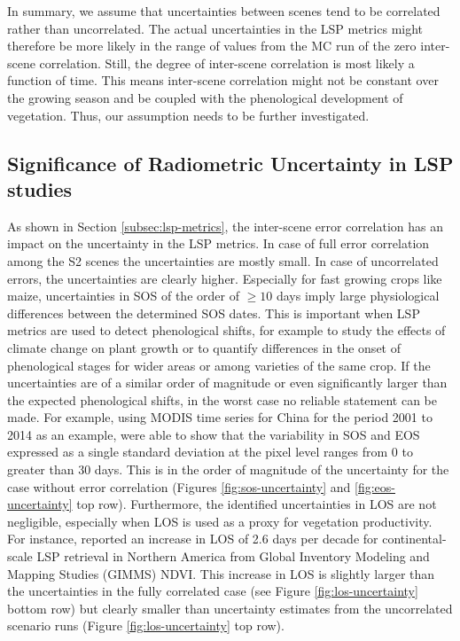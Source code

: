 In summary, we assume that uncertainties between scenes tend to be correlated rather than uncorrelated. The actual uncertainties in the \gls{LSP} metrics might therefore be more likely in the range of values from the  \gls{MC} run of the zero inter-scene correlation. Still, the degree of inter-scene correlation is most likely a function of time. This means inter-scene correlation might not be constant over the growing season and be coupled with the phenological development of vegetation. Thus, our assumption needs to be further investigated.

\subsection{Significance of Radiometric Uncertainty in \gls{LSP} studies}

As shown in Section \ref{subsec:lsp-metrics}, the inter-scene error correlation has an impact on the uncertainty in the \gls{LSP} metrics. In case of full error correlation among the \gls{S2} scenes the uncertainties are mostly small. In case of uncorrelated errors, the uncertainties are clearly higher. Especially for fast growing crops like maize, uncertainties in \gls{SOS} of the order of $\ge10$ days imply large physiological differences between the determined \gls{SOS} dates. This is important when \gls{LSP} metrics are used to detect phenological shifts, for example to study the effects of climate change on plant growth \citep{garonna_variability_2016} or to quantify differences in the onset of phenological stages for wider areas \citep{nietupski_spatiotemporal_2021} or among varieties of the same crop. If the uncertainties are of a similar order of magnitude or even significantly larger than the expected phenological shifts, in the worst case no reliable statement can be made. For example, using MODIS time series for China for the period 2001 to 2014 as an example, \cite{luo_spatiotemporal_2017} were able to show that the variability in \gls{SOS} and \gls{EOS} expressed as a single standard deviation at the pixel level ranges from 0 to greater than 30 days. This is in the order of magnitude of the uncertainty for the case without error correlation (Figures \ref{fig:sos-uncertainty} and \ref{fig:eos-uncertainty} top row). Furthermore, the identified uncertainties in \gls{LOS} are not negligible, especially when \gls{LOS} is used as a proxy for vegetation productivity. For instance, \cite{park_changes_2016} reported an increase in \gls{LOS} of 2.6 days per decade for continental-scale \gls{LSP} retrieval in Northern America from Global Inventory Modeling
and Mapping Studies (GIMMS) NDVI. This increase in \gls{LOS} is slightly larger than the uncertainties in the fully correlated case (see Figure \ref{fig:los-uncertainty} bottom row) but clearly smaller than uncertainty estimates from the uncorrelated scenario runs (Figure \ref{fig:los-uncertainty} top row).

